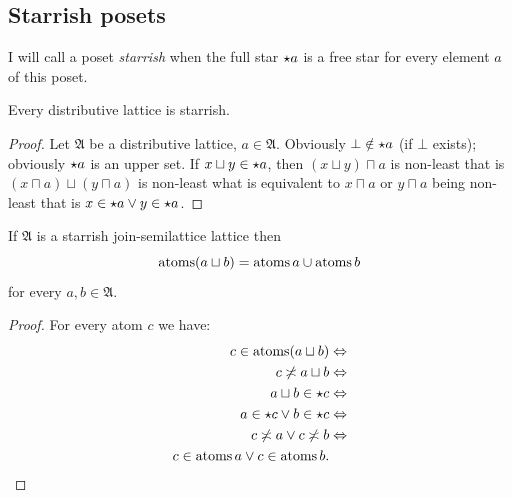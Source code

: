 \subsection{Starrish posets}\label{sec-filtrator-starrish}
\begin{defn}
I will call a poset \emph{starrish}
when the full star $\star a$ is a free star for every element
$a$ of this poset.\end{defn}
\begin{prop}
Every distributive lattice is starrish.\end{prop}
\begin{proof}
Let $\mathfrak{A}$ be a distributive lattice, $a\in\mathfrak{A}$.
Obviously $\bot\notin\star a$ (if $\bot$ exists); obviously
$\star a$ is an upper set. If $x\sqcup y\in\star a$, then
$(x\sqcup y)\sqcap a$ is non-least that is $(x\sqcap a)\sqcup(y\sqcap a)$
is non-least what is equivalent to $x\sqcap a$ or $y\sqcap a$ being
non-least that is $x\in\star a\lor y\in\star a$.\end{proof}
\begin{thm}
\label{atoms-join}If $\mathfrak{A}$ is a starrish join-semilattice
lattice then
\[
\operatorname{atoms}(a\sqcup b)=\operatorname{atoms} a\cup\operatorname{atoms} b
\]
for every $a,b\in\mathfrak{A}$.\end{thm}
\begin{proof}
For every atom $c$ we have:
\begin{align*}
c\in\operatorname{atoms}(a\sqcup b) & \Leftrightarrow\\
c\not\asymp a\sqcup b & \Leftrightarrow\\
a\sqcup b\in\star c & \Leftrightarrow\\
a\in\star c\lor b\in\star c & \Leftrightarrow\\
c\not\asymp a\lor c\not\asymp b & \Leftrightarrow\\
c\in\operatorname{atoms} a\lor c\in\operatorname{atoms} b.
\end{align*}

\end{proof}

